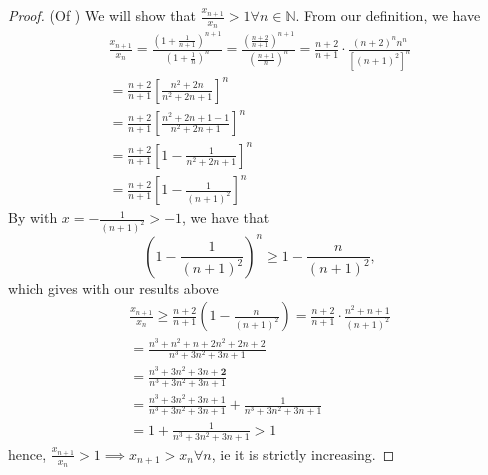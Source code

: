 \documentclass[12pt]{article}
\begin{document}
\begin{proof}(Of )
  We will show that $\frac{x_{n+1}}{x_n} > 1 \forall n \in \mathbb{N}$. From our definition, we have \begin{align*}
    \frac{x_{n+1}}{x_n} = \frac{\left(1 + \frac{1}{n+1}\right)^{n+1}}{\left(1 + \frac{1}{n}\right)^n} = \frac{\left(\frac{n+2}{n+1}\right)^{n+1}}{\left(\frac{n+1}{n}\right)^n} = \frac{n+2}{n+1} \cdot \frac{(n+2)^n n^n}{\left[(n+1)^2\right]^n}\\
    = \frac{n+2}{n+1} \left[
      \frac{n^2 + 2n}{n^2 + 2n + 1}
    \right]^n\\
    = \frac{n+2}{n+1} \left[
      \frac{n^2 + 2n + 1 - 1}{n^2 + 2n + 1}
    \right]^n\\
    = \frac{n+2}{n+1} \left[1 - 
      \frac{1}{n^2 + 2n + 1}
    \right]^n\\
    = \frac{n+2}{n+1} \left[1 - \frac{1}{(n+1)^2}\right]^n
  \end{align*}
  By  with $x = -\frac{1}{(n+1)^2} > -1$, we have that \[
  \left(1 - \frac{1}{(n+1)^2}\right)^n \geq 1 - \frac{n}{(n+1)^2},  
  \]
  which gives with our results above
  \begin{align*}
    \frac{x_{n+1}}{x_n} \geq \frac{n+2}{n+1} \left(1 - \frac{n}{(n+1)^2}\right) = \frac{n+2}{n+1} \cdot \frac{n^2 + n + 1}{(n+1)^2}\\
    = \frac{
    n^3 + n^2 + n + 2n^2 + 2n + 2
    }{
    n^3 + 3n^2 + 3n + 1
    } \\
    = \frac{n^3 + 3n^2 + 3n + \mathbf{2}}{n^3 + 3n^2 + 3n + 1}\\
    =  \frac{n^3 + 3n^2 + 3n + 1}{n^3 + 3n^2 + 3n + 1} +  \frac{1}{n^3 + 3n^2 + 3n + 1} \\
    = 1 + \frac{1}{n^3 + 3n^2 + 3n + 1} > 1
  \end{align*}
  hence, $\frac{x_{n+1}}{x_{n}}> 1 \implies x_{n+1} > x_n \forall n$, ie it is strictly increasing.
\end{proof}
\end{document}

